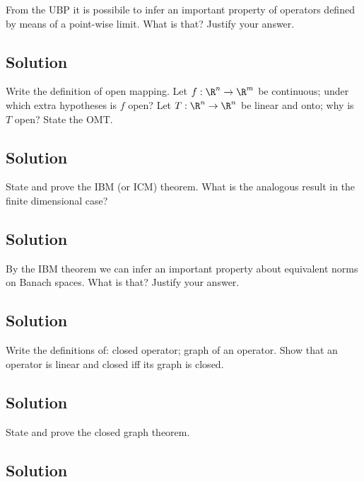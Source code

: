 
\question
From the UBP it is possibile to infer an important property of operators defined by means of a point-wise limit. What is that? Justify your answer.

\subsection*{Solution}


\question
Write the definition of open mapping. Let $f: \R^n \to \R^m$ be continuous; under which extra hypotheses is $f$ open? Let $T: \R^n \to \R^n$ be linear and onto; why is $T$ open? State the OMT.

\subsection*{Solution}


\question
State and prove the IBM (or ICM) theorem. What is the analogous result in the finite dimensional case?

\subsection*{Solution}


\question
By the IBM theorem we can infer an important property about equivalent norms on Banach spaces. What is that? Justify your answer.

\subsection*{Solution}


\question
Write the definitions of: closed operator; graph of an operator. Show that an operator is linear and closed iff its graph is closed.

\subsection*{Solution}


\question
State and prove the closed graph theorem.

\subsection*{Solution}

